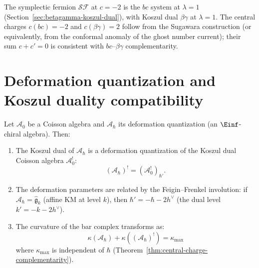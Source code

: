 \begin{remark}
\label{rem:sf-koszul-dual}
The symplectic fermion $\mathcal{SF}$ at $c = -2$ is the $bc$ system at $\lambda = 1$ (Section~\ref{sec:betagamma-koszul-dual}), with Koszul dual $\beta\gamma$ at $\lambda = 1$.  The central charges $c(bc) = -2$ and $c(\beta\gamma) = 2$ follow from the Sugawara construction (or equivalently, from the conformal anomaly of the ghost number current); their sum $c + c' = 0$ is consistent with $bc$--$\beta\gamma$ complementarity.
\end{remark}


\section{Deformation quantization and Koszul duality compatibility}
\label{sec:dq-koszul-compatibility}

\begin{theorem}
\label{thm:dq-koszul-compatible}
Let $\mathcal{A}_0$ be a Coisson algebra and
$\mathcal{A}_\hbar$ its deformation quantization (an $\Einf$-chiral
algebra).  Then:
\begin{enumerate}
\item The Koszul dual of $\mathcal{A}_\hbar$ is a deformation
quantization of the Koszul dual Coisson algebra $\mathcal{A}_0^!$:
\[
(\mathcal{A}_\hbar)^! = (\mathcal{A}_0^!)_{\hbar'}.
\]
\item The deformation parameters are related by the Feigin--Frenkel
involution: if $\mathcal{A}_\hbar = \widehat{\mathfrak{g}}_k$
(affine KM at level $k$), then $\hbar' = -\hbar - 2h^\vee$
(the dual level $k' = -k - 2h^\vee$).
\item The curvature of the bar complex transforms as:
\[
\kappa(\mathcal{A}_\hbar) + \kappa((\mathcal{A}_\hbar)^!)
= \kappa_{\mathrm{max}}
\]
where $\kappa_{\mathrm{max}}$ is independent of $\hbar$
(Theorem~\ref{thm:central-charge-complementarity}).
\end{enumerate}
\end{theorem}


